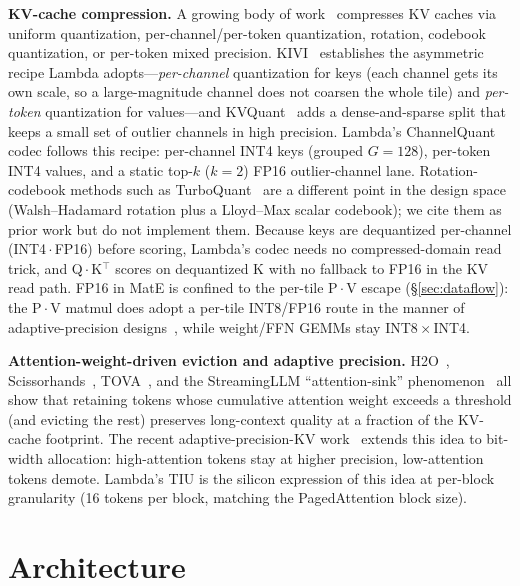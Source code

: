 \documentclass[conference]{IEEEtran}
\begin{document}
\textbf{KV-cache compression.} A growing body of work~\cite{kivi,kvquant,kv_survey,quarot,rotatekv,turboquant} compresses KV caches via uniform quantization, per-channel/per-token quantization, rotation, codebook quantization, or per-token mixed precision. KIVI~\cite{kivi} establishes the asymmetric recipe Lambda adopts---\emph{per-channel} quantization for keys (each channel gets its own scale, so a large-magnitude channel does not coarsen the whole tile) and \emph{per-token} quantization for values---and KVQuant~\cite{kvquant} adds a dense-and-sparse split that keeps a small set of outlier channels in high precision. Lambda's ChannelQuant codec follows this recipe: per-channel INT4 keys (grouped $G{=}128$), per-token INT4 values, and a static top-$k$ ($k{=}2$) FP16 outlier-channel lane. Rotation-codebook methods such as TurboQuant~\cite{turboquant} are a different point in the design space (Walsh--Hadamard rotation plus a Lloyd--Max scalar codebook); we cite them as prior work but do not implement them. Because keys are dequantized per-channel (INT4\,$\cdot$\,FP16) before scoring, Lambda's codec needs no compressed-domain read trick, and Q\,$\cdot$\,K$^\top$ scores on dequantized K with no fallback to FP16 in the KV read path. FP16 in MatE is confined to the per-tile P\,$\cdot$\,V escape (\S\ref{sec:dataflow}): the P\,$\cdot$\,V matmul does adopt a per-tile INT8/FP16 route in the manner of adaptive-precision designs~\cite{adaptive_kv,chaithu_acu}, while weight/FFN GEMMs stay INT8\,$\times$\,INT4.

\textbf{Attention-weight-driven eviction and adaptive precision.} H2O~\cite{h2o}, Scissorhands~\cite{scissorhands}, TOVA~\cite{tova}, and the StreamingLLM ``attention-sink'' phenomenon~\cite{streamingllm} all show that retaining tokens whose cumulative attention weight exceeds a threshold (and evicting the rest) preserves long-context quality at a fraction of the KV-cache footprint. The recent adaptive-precision-KV work~\cite{adaptive_kv} extends this idea to bit-width allocation: high-attention tokens stay at higher precision, low-attention tokens demote. Lambda's TIU is the silicon expression of this idea at per-block granularity (16 tokens per block, matching the PagedAttention block size).

\section{Architecture}
\label{sec:architecture}
\end{document}
